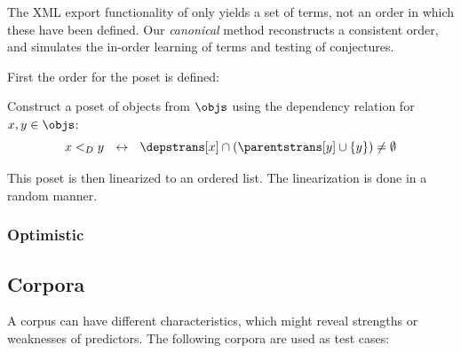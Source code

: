 The XML export functionality of \coq only yields a set of terms, not an order in which these have been defined.
Our \emph{canonical} method reconstructs a consistent order, and simulates the in-order learning of terms and testing of conjectures.

First the order for the poset is defined:
\begin{definition}
  Construct a poset of objects from $\objs$ using the dependency relation for $x, y \in \objs$:
  \[
    x <_D y ~~\leftrightarrow~~ \depstrans[x] \cap (\parentstrans[y] \cup \{y\}) \neq \emptyset
  \]
\end{definition}

This poset is then linearized to an ordered list.
The linearization is done in a random manner.

\subsubsection{Optimistic}




\subsection{Corpora}
\label{section:corpora}


A corpus can have different characteristics, which might reveal strengths or weaknesses of predictors.
The following corpora are used as test cases:


